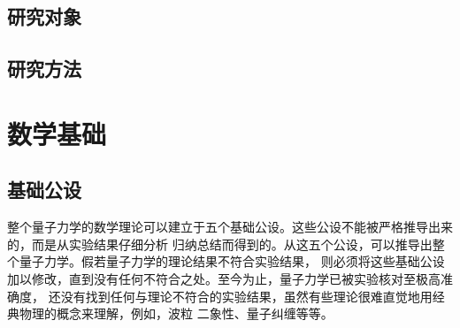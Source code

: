 \documentclass[type=master]{fduthesis}
\begin{document}
\section{研究对象}

\section{研究方法}

\chapter{数学基础}

\section{基础公设}

整个量子力学的数学理论可以建立于五个基础公设。这些公设不能被严格推导出来的，而是从实验结果仔细分析
归纳总结而得到的。从这五个公设，可以推导出整个量子力学。假若量子力学的理论结果不符合实验结果，
则必须将这些基础公设加以修改，直到没有任何不符合之处。至今为止，量子力学已被实验核对至极高准确度，
还没有找到任何与理论不符合的实验结果，虽然有些理论很难直觉地用经典物理的概念来理解，例如，波粒
二象性、量子纠缠等等\cite{zurek2014quantum,cohen2013claude,zettili2003quantum}。
\end{document}
